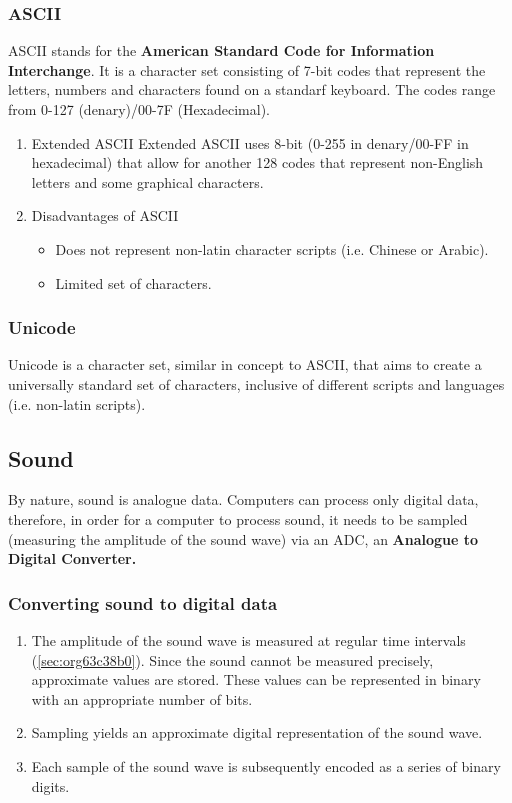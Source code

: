 \documentclass[11pt]{article}
\begin{document}
\subsubsection{ASCII}
\label{sec:org698599d}
ASCII stands for the \textbf{American Standard Code for Information Interchange}. It is a character set consisting of 7-bit codes that represent the letters, numbers and characters found on a standarf keyboard. The codes range from 0-127 (denary)/00-7F (Hexadecimal).
\begin{enumerate}
\item Extended ASCII
\label{sec:org3c245b8}
Extended ASCII uses 8-bit (0-255 in denary/00-FF in hexadecimal) that allow for another 128 codes that represent non-English letters and some graphical characters.
\item Disadvantages of ASCII
\label{sec:org9ea02cc}
\begin{itemize}
\item Does not represent non-latin character scripts (i.e. Chinese or Arabic).
\item Limited set of characters.
\end{itemize}
\end{enumerate}
\subsubsection{Unicode}
\label{sec:org858cdc0}
Unicode is a character set, similar in concept to ASCII, that aims to create a universally standard set of characters, inclusive of different scripts and languages (i.e. non-latin scripts).
\subsection{Sound}
\label{sec:orgf439cb3}
By nature, sound is analogue data. Computers can process only digital data, therefore, in order for a computer to process sound, it needs to be sampled (measuring the amplitude of the sound wave) via an ADC, an \textbf{Analogue to Digital Converter.}
\subsubsection{Converting sound to digital data}
\label{sec:org969f5a2}
\begin{enumerate}
\item The amplitude of the sound wave is measured at regular time intervals (\ref{sec:org63c38b0}). Since the sound cannot be measured precisely, approximate values are stored. These values can be represented in binary with an appropriate number of bits.
\item Sampling yields an approximate digital representation of the sound wave.
\item Each sample of the sound wave is subsequently encoded as a series of binary digits.
\end{enumerate}
\end{document}
